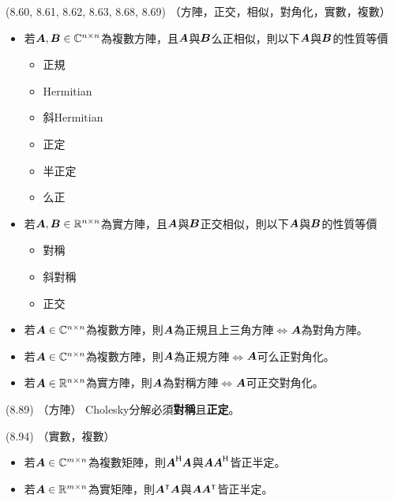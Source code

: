 \item \begin{theorem}{(8.60, 8.61, 8.62, 8.63, 8.68, 8.69)} （方陣，正交，相似，對角化，實數，複數）
	\begin{itemize}
		\item 若$\boldsymbol{A}, \boldsymbol{B} \in \mathbb{C}^{n \times n}$為複數方陣，且$\boldsymbol{A}$與$\boldsymbol{B}$么正相似，則以下$\boldsymbol{A}$與$\boldsymbol{B}$的性質等價
			\begin{itemize}
				\item 正規
				\item Hermitian
				\item 斜Hermitian
				\item 正定
				\item 半正定
				\item 么正
			\end{itemize}
		\item 若$\boldsymbol{A}, \boldsymbol{B} \in \mathbb{R}^{n \times n}$為實方陣，且$\boldsymbol{A}$與$\boldsymbol{B}$正交相似，則以下$\boldsymbol{A}$與$\boldsymbol{B}$的性質等價
		\begin{itemize}
			\item 對稱
			\item 斜對稱
			\item 正交
		\end{itemize}
		\item 若$\boldsymbol{A} \in \mathbb{C}^{n \times n}$為複數方陣，則$\boldsymbol{A}$為正規且上三角方陣$\iff$$\boldsymbol{A}$為對角方陣。
		\item 若$\boldsymbol{A} \in \mathbb{C}^{n \times n}$為複數方陣，則$\boldsymbol{A}$為正規方陣$\iff$$\boldsymbol{A}$可么正對角化。
		\item 若$\boldsymbol{A} \in \mathbb{R}^{n \times n}$為實方陣，則$\boldsymbol{A}$為對稱方陣$\iff$$\boldsymbol{A}$可正交對角化。
	\end{itemize}
\end{theorem}

\item \begin{theorem}{(8.89)} （方陣） Cholesky分解必須\textbf{對稱}且\textbf{正定}。
\end{theorem}

\item \begin{theorem}{(8.94)} （實數，複數）
	\begin{itemize}
		\item 若$\boldsymbol{A} \in \mathbb{C}^{m \times n}$為複數矩陣，則$\boldsymbol{A}^{\mathsf{H}}\boldsymbol{A}$與$\boldsymbol{A}\boldsymbol{A}^{\mathsf{H}}$皆正半定。
		\item 若$\boldsymbol{A} \in \mathbb{R}^{m \times n}$為實矩陣，則$\boldsymbol{A}^\intercal\boldsymbol{A}$與$\boldsymbol{A}\boldsymbol{A}^\intercal$皆正半定。
	\end{itemize}
\end{theorem}

